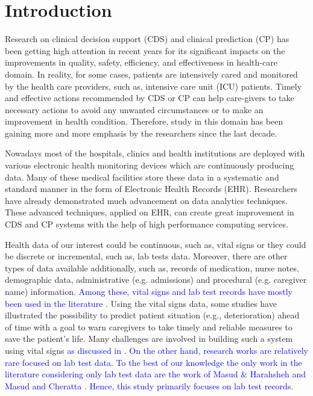 \section{Introduction}
Research on clinical decision support (CDS) and clinical prediction (CP) has been getting high attention in recent years for its significant impacts on the improvements in quality, safety, efficiency, and effectiveness in health-care domain. In reality, for some cases, patients are intensively cared and monitored by the health care providers, such as, intensive care unit (ICU) patients. Timely and effective actions recommended by CDS or CP can help care-givers to take necessary actions to avoid any unwanted circumstances or to make an improvement in health condition. Therefore, study in this domain has been gaining more and more emphasis by the researchers since the last decade.

Nowadays most of the hospitals, clinics and health institutions are deployed with various electronic health monitoring devices which are continuously producing data. Many of these medical facilities store these data in  a systematic and standard manner in the form of Electronic Health Records (EHR). Researchers have already demonstrated much advancement on data analytics techniques. These advanced techniques, applied on EHR, can create great improvement in CDS and CP systems with the help of high performance computing services.

Health data of our interest could be continuous, such as, vital signs or they could be discrete or incremental, such as, lab tests data. Moreover, there are other types of data available additionally, such as, records of medication, nurse notes, demographic data, administrative (e.g. admissions) and procedural (e.g. caregiver name) information. \textcolor{blue}{Among these, vital signs and lab test records have mostly been used in the literature \cite{Mao,Fialho,Baumgartner,Cheng, Ghassemi2015, Jin2018, Yoon2016, Johnson2017, Calvert2016, Suresh2017, Bhattacharya2017, Xie2017, Awad2017, Nguyen2017, Zhang2017, Johnson2nd2017, Davoodi2018, Sadeghi2018, Zheng2018, Johnson3rd2018, Zahid2018, Purushotham2018, Meyer2018, Hsieh2018, Ho2019, Gennatas2019, Torres2019}}. Using the vital signs data, some studies have illustrated the possibility to predict patient situation (e.g., deterioration) ahead of time with a goal to warn caregivers to take timely and reliable measures to save the patient’s life. Many challenges are involved in building such a system using vital signs \textcolor{blue}{as discussed in \cite{Mao,Fialho,Baumgartner,Cheng, ZhengpingChe2016, Zahid2018, Zheng2018, Xiao2018}. On the other hand, research works are relatively rare focused on lab test data. To the best of our knowledge the only work in the literature considering only lab test data are the work of  Masud \& Harahsheh \cite{mehedy-masud:2017:fvc} and Masud and Cheratta \cite{mehedy-masud:2018:frmwrk}. Hence, this study primarily focuses on lab test records}.

